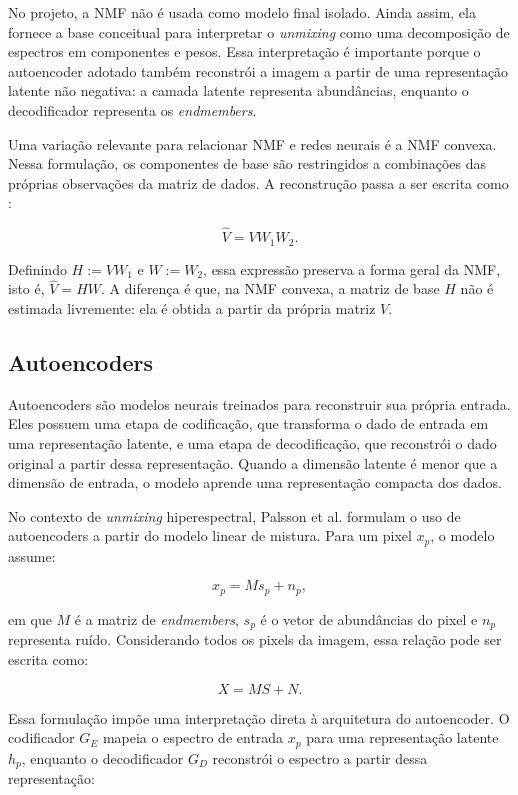 \documentclass[conference]{IEEEtran}
\begin{document}
No projeto, a NMF não é usada como modelo final isolado. Ainda assim, ela fornece
a base conceitual para interpretar o \textit{unmixing} como uma decomposição de
espectros em componentes e pesos. Essa interpretação é importante porque o
autoencoder adotado também reconstrói a imagem a partir de uma representação
latente não negativa: a camada latente representa abundâncias, enquanto o
decodificador representa os \textit{endmembers}.

Uma variação relevante para relacionar NMF e redes neurais é a NMF convexa. Nessa
formulação, os componentes de base são restringidos a combinações das próprias
observações da matriz de dados. A reconstrução passa a ser escrita como
\cite{egendal2024relation}:

\[
\hat{V} = V W_1 W_2.
\]

Definindo $H := V W_1$ e $W := W_2$, essa expressão preserva a forma geral da
NMF, isto é, $\hat{V} = HW$. A diferença é que, na NMF convexa, a matriz de base
$H$ não é estimada livremente: ela é obtida a partir da própria matriz $V$.

\subsection{Autoencoders}

Autoencoders são modelos neurais treinados para reconstruir sua própria entrada.
Eles possuem uma etapa de codificação, que transforma o dado de entrada em uma
representação latente, e uma etapa de decodificação, que reconstrói o dado
original a partir dessa representação. Quando a dimensão latente é menor que a
dimensão de entrada, o modelo aprende uma representação compacta dos dados.

No contexto de \textit{unmixing} hiperespectral, Palsson et al.
\cite{palsson2018autoencoder} formulam o uso de autoencoders a partir do modelo
linear de mistura. Para um pixel $x_p$, o modelo assume:

\[
x_p = M s_p + n_p,
\]

em que $M$ é a matriz de \textit{endmembers}, $s_p$ é o vetor de abundâncias do
pixel e $n_p$ representa ruído. Considerando todos os pixels da imagem, essa
relação pode ser escrita como:

\[
X = MS + N.
\]

Essa formulação impõe uma interpretação direta à arquitetura do autoencoder. O
codificador $G_E$ mapeia o espectro de entrada $x_p$ para uma representação
latente $h_p$, enquanto o decodificador $G_D$ reconstrói o espectro a partir
dessa representação:
\end{document}
